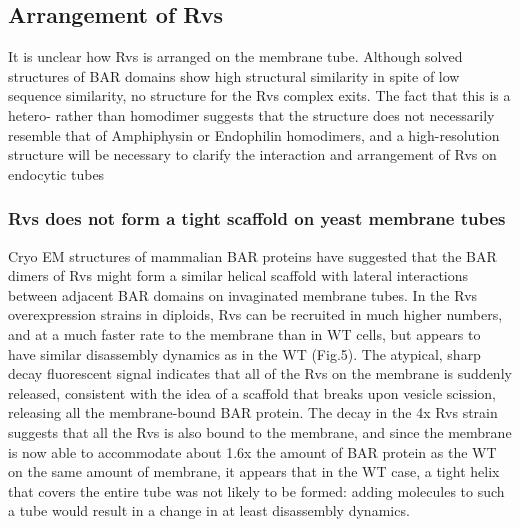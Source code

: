 \subsection{Arrangement of Rvs}

It is unclear how Rvs is arranged on the membrane tube. Although solved structures of BAR domains show high structural similarity in spite of low sequence similarity, no structure for the Rvs complex exits. The fact that this is a hetero- rather than homodimer suggests that the structure does not necessarily resemble that of Amphiphysin or Endophilin homodimers, and a high-resolution structure will be necessary to clarify the interaction and arrangement of Rvs on endocytic tubes

\subsubsection{Rvs does not form a tight scaffold on yeast membrane tubes}
Cryo EM structures of mammalian BAR proteins have suggested that the BAR dimers of Rvs might form a similar helical scaffold with lateral interactions between adjacent BAR domains on invaginated membrane tubes. In the Rvs overexpression strains in diploids, Rvs can be recruited in much higher numbers, and at a much faster rate to the membrane than in WT cells, but appears to have similar disassembly dynamics as in the WT (Fig.5). The atypical, sharp decay fluorescent signal indicates that all of the Rvs on the membrane is suddenly released, consistent with the idea of a scaffold that breaks upon vesicle scission, releasing all the membrane-bound BAR protein. The decay in the 4x Rvs strain suggests that all the Rvs is also bound to the membrane, and since the membrane is now able to accommodate about 1.6x the amount of BAR protein as the WT on the same amount of membrane, it appears that in the WT case, a tight helix that covers the entire tube was not likely to be formed: adding molecules to such a tube would result in a change in at least disassembly dynamics.

